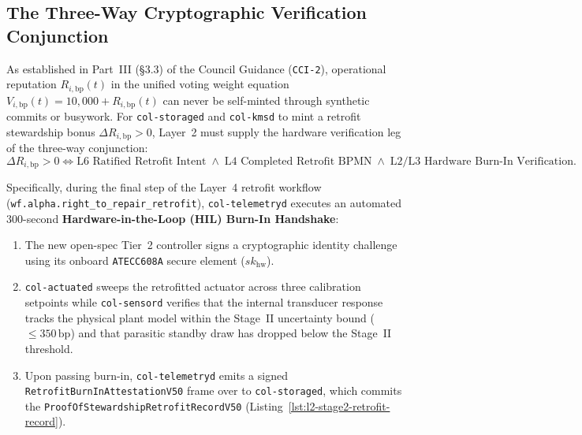 \subsection{The Three-Way Cryptographic Verification Conjunction}

As established in Part~III (\S3.3) of the Council Guidance (\texttt{CCI-2}), operational reputation $R_{i,\mathrm{bp}}(t)$ in the unified voting weight equation $V_{i,\mathrm{bp}}(t) = 10{,}000 + R_{i,\mathrm{bp}}(t)$ can never be self-minted through synthetic commits or busywork. For \texttt{col-storaged} and \texttt{col-kmsd} to mint a retrofit stewardship bonus $\Delta R_{i,\mathrm{bp}} > 0$, Layer~2 must supply the hardware verification leg of the three-way conjunction:
\begin{equation}
    \Delta R_{i,\mathrm{bp}} > 0 \iff \text{L6 Ratified Retrofit Intent} \;\land\; \text{L4 Completed Retrofit BPMN} \;\land\; \text{L2/L3 Hardware Burn-In Verification}.
    \label{eq:l2-retrofit-stewardship-conjunction}
\end{equation}

Specifically, during the final step of the Layer~4 retrofit workflow (\texttt{wf.alpha.right\_to\_repair\_retrofit}), \texttt{col-telemetryd} executes an automated 300-second \textbf{Hardware-in-the-Loop (HIL) Burn-In Handshake}:
\begin{enumerate}
    \item The new open-spec Tier~2 controller signs a cryptographic identity challenge using its onboard \texttt{ATECC608A} secure element ($sk_{\mathrm{hw}}$).
    \item \texttt{col-actuated} sweeps the retrofitted actuator across three calibration setpoints while \texttt{col-sensord} verifies that the internal transducer response tracks the physical plant model within the Stage~II uncertainty bound ($\le 350\,\mathrm{bp}$) and that parasitic standby draw has dropped below the Stage~II threshold.
    \item Upon passing burn-in, \texttt{col-telemetryd} emits a signed \texttt{RetrofitBurnInAttestationV50} frame over  to \texttt{col-storaged}, which commits the \texttt{ProofOfStewardshipRetrofitRecordV50} (Listing~\ref{lst:l2-stage2-retrofit-record}).
\end{enumerate}

